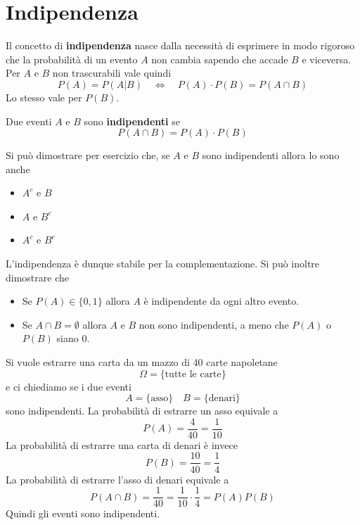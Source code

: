 \section{Indipendenza}
Il concetto di \textbf{indipendenza} nasce dalla necessità di esprimere in modo rigoroso che la
probabilità di un evento $A$ non cambia sapendo che accade $B$ e viceversa. Per $A$ e $B$ non
trascurabili vale quindi
\[ P(A) = P(A | B) \quad \Leftrightarrow \quad P(A) \cdot P(B) = P(A \cap B) \]
Lo stesso vale per $P(B)$.

\begin{definition}
	Due eventi $A$ e $B$ sono \textbf{indipendenti} se
	\[ P(A \cap B) = P(A) \cdot P(B) \]
\end{definition}

Si può dimostrare per esercizio che, se $A$ e $B$ sono indipendenti allora lo sono anche
\begin{itemize}
	\item $A^c$ e $B$
	\item $A$ e $B^c$
	\item $A^c$ e $B^c$
\end{itemize}
L'indipendenza è dunque stabile per la complementazione. Si può inoltre dimostrare che
\begin{itemize}
	\item Se $P(A) \in \{ 0, 1 \}$ allora $A$ è indipendente da ogni altro evento.
	\item Se $A \cap B = \emptyset$ allora $A$ e $B$ non sono indipendenti, a meno che $P(A)$ o
	      $P(B)$ siano 0.
\end{itemize}

\begin{example}
	Si vuole estrarre una carta da un mazzo di 40 carte napoletane
	\[ \Omega = \{ \text{tutte le carte} \} \]
	e ci chiediamo se i due eventi
	\[ A = \{ \text{asso} \} \quad B = \{ \text{denari} \} \]
	sono indipendenti. La probabilità di estrarre un asso equivale a
	\[ P(A) = \frac{4}{40} = \frac{1}{10} \]
	La probabilità di estrarre una carta di denari è invece
	\[ P(B) = \frac{10}{40} = \frac{1}{4} \]
	La probabilità di estrarre l'asso di denari equivale a
	\[ P(A \cap B) = \frac{1}{40} = \frac{1}{10} \cdot \frac{1}{4} = P(A) P(B) \]
	Quindi gli eventi sono indipendenti.
\end{example}

